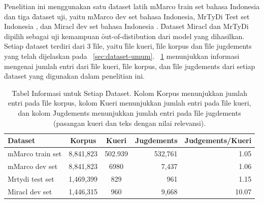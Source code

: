Penelitian ini menggunakan satu \f{dataset} latih mMarco \f{train set} bahasa Indonesia \citep{mmarco} dan tiga \f{dataset} uji, yaitu mMarco \f{dev set} bahasa Indonesia, MrTyDi Test set Indonesia \citep{mrtydi}, dan Miracl \f{dev set} bahasa Indonesia \citep{miracl}. \f{Dataset} Miracl dan MrTyDi dipilih sebagai uji kemampuan \f{out-of-distibution} dari model yang dihasilkan. Setiap \f{dataset} terdiri dari 3 \f{file}, yaitu \f{file} kueri, \f{file} korpus dan \f{file jugdements} yang telah dijelaskan pada \sect~\ref{sec:dataset-umum}. \tab~\ref{tab:dataset-info} menunjukkan informasi mengenai jumlah entri dari \f{file} kueri, \f{file} korpus, dan \f{file jugdements} dari setiap \f{dataset} yang digunakan dalam penelitian ini.
\begin{table}[!ht]
    \centering
    \caption{Tabel Informasi untuk Setiap \f{Dataset}. Kolom \f{Korpus} menunjukkan jumlah entri pada \f{file korpus}, kolom \f{Kueri} menunjukkan jumlah entri pada \f{file kueri}, dan kolom \f{Jugdements} menunjukkan jumlah entri pada \f{file jugdements} (pasangan kueri dan teks dengan nilai relevansi).}
    \label{tab:dataset-info}
    \begin{tabular}{|l|c|c|r| r|} \hline
        \textbf{Dataset} & \textbf{Korpus} & \textbf{Kueri} & \textbf{Jugdements} & \textbf{Judgements/Kueri} \\ \hline
        mMarco train set & 8,841,823       & 502.939        & 532,761             & 1.05                         \\ \hline
        mMarco dev set   & 8,841,823       & 6980           & 7,437               & 1.06                         \\ \hline
        Mrtydi test set  & 1,469,399       & 829            & 961                 & 1.15                        \\ \hline
        Miracl dev set   & 1,446,315       & 960            & 9,668               & 10.07                       \\ \hline
    \end{tabular}
\end{table}


